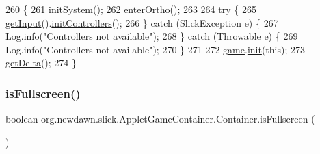 \begin{DoxyCode}
260                                                      \{
261          \mbox{\hyperlink{classorg_1_1newdawn_1_1slick_1_1_game_container_a6fee625fa386e0ef5a99b6f4bcc3f147}{initSystem}}();
262          \mbox{\hyperlink{classorg_1_1newdawn_1_1slick_1_1_game_container_a1e8c835b781b018347f50dcf37bbb5c2}{enterOrtho}}();
263 
264          \textcolor{keywordflow}{try} \{
265             \mbox{\hyperlink{classorg_1_1newdawn_1_1slick_1_1_game_container_a6042fd06c54872f9f791bd33beffec88}{getInput}}().\mbox{\hyperlink{classorg_1_1newdawn_1_1slick_1_1_input_ab570b66f776cd2148c7ccf026dfd9b08}{initControllers}}();
266          \} \textcolor{keywordflow}{catch} (SlickException e) \{
267             Log.info(\textcolor{stringliteral}{"Controllers not available"});
268          \} \textcolor{keywordflow}{catch} (Throwable e) \{
269             Log.info(\textcolor{stringliteral}{"Controllers not available"});
270          \}
271 
272          \mbox{\hyperlink{classorg_1_1newdawn_1_1slick_1_1_game_container_a6a38bb26e45e1c884940caf35c7cfcdc}{game}}.\mbox{\hyperlink{interfaceorg_1_1newdawn_1_1slick_1_1_game_ad2dd6affab08bb8fdb5fab0815957b7a}{init}}(\textcolor{keyword}{this});
273          \mbox{\hyperlink{classorg_1_1newdawn_1_1slick_1_1_game_container_a47af7100d91a7101cb71574dc70fb0dc}{getDelta}}();
274       \}
\end{DoxyCode}
\mbox{\label{classorg_1_1newdawn_1_1slick_1_1_applet_game_container_1_1_container_aaa2fdeeb3fc168eb5cb44befe9194243}} 
\subsubsection{\texorpdfstring{is\+Fullscreen()}{isFullscreen()}}
{\footnotesize\ttfamily boolean org.\+newdawn.\+slick.\+Applet\+Game\+Container.\+Container.\+is\+Fullscreen (\begin{DoxyParamCaption}{ }\end{DoxyParamCaption})\hspace{0.3cm}{\ttfamily [inline]}}


